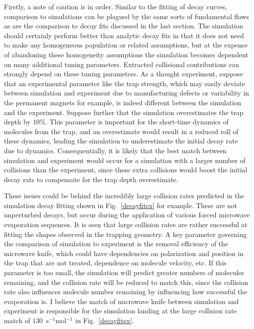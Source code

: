 Firstly, a note of caution is in order.
Similar to the fitting of decay curves, comparison to simulations can be plagued by the same sorts of fundamental flaws as are the comparison to decay fits discussed in the last section.
The simulation should certainly perform better than analytic decay fits in that it does not need to make any homogeneous population or related assumptions, but at the expense of abandoning these homogeneity assumptions the simulation becomes dependent on many additional tuning parameters.
Extracted collisional contributions can strongly depend on these tuning parameters.
As a thought experiment, suppose that an experimental parameter like the trap strength, which may easily deviate between simulation and experiment due to manufacturing defects or variability in the permanent magnets for example, is indeed different between the simulation and the experiment. 
Suppose further that the simulation overestimates the trap depth by $10$\%.
This parameter is important for the short-time dynamics of molecules from the trap, and an overestimate would result in a reduced roll of these dynamics, leading the simulation to underestimate the initial decay rate due to dynamics.
Consequentially, it is likely that the best match between simulation and experiment would occur for a simulation with a larger number of collisions than the experiment, since these extra collisions would boost the initial decay rats to compensate for the trap depth overestimate.

These issues could be behind the incredibly large collision rates predicted in the simulation decay fitting shown in Fig.~\ref{decayfitex} for example.
These are not unperturbed decays, but occur during the application of various forced microwave evaporation sequences.
It is seen that large collision rates are rather successful at fitting the shapes observed in the trapping geometry.
A key parameter governing the comparison of simulation to experiment is the removal efficiency of the microwave knife, which could have dependencies on polarization and position in the trap that are not treated, dependence on molecule velocity, etc.
If this parameter is too small, the simulation will predict greater numbers of molecules remaining, and the collision rate will be reduced to match this, since the collision rate also influences molecule number remaining by influencing how successful the evaporation is.
I believe the match of microwave knife between simulation and experiment is responsible for the simulation landing at the large collision rate match of $130$~s$^{-1}$mol$^{-1}$ in Fig.~\ref{decayfitex}.

